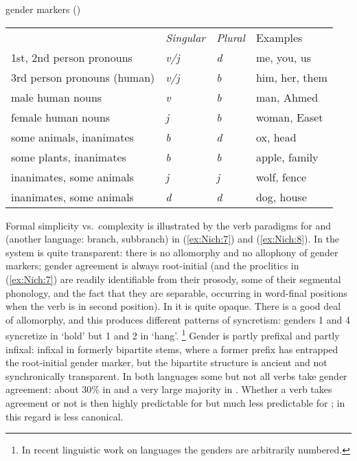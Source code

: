 \documentclass[output=collectionpaper]{langsci/langscibook}
\begin{document}
\ea
\label{ex:Nich:6}
 gender markers (\citealt[144]{Nichols2011})\\
\begin{tabular}{l>{\itshape}l>{\itshape}ll}
					 &	{\normalfont Singular} &	{\normalfont Plural} &	{\normalfont Examples} \\
1st, 2nd person pronouns & 			v/j	 &	d  &		me, you, us \\
3rd person pronouns (human) 	 &	v/j	 &	b 	 &	him, her, them \\
male human nouns 			 &	v 	 &	b 	 &	man, Ahmed \\
female human nouns			  &	j 	 &	b 	 &	woman, Easet \\
some animals, inanimates 		 &	b  &		d  &		ox, head \\
some plants, inanimates	 &		b 		 &b	 &	apple, family \\
inanimates, some animals  &			j 	 &	j  &		wolf, fence \\
inanimates, some animals  &			d 	 &	d  &		dog, house \\
\end{tabular}
\z

Formal simplicity vs.\ complexity is illustrated by the verb paradigms for  and  (another  language:  branch,  subbranch) in (\ref{ex:Nich:7}) and (\ref{ex:Nich:8}). In  the system is quite transparent: there is no allomorphy and no allophony of gender markers; gender agreement is always root-initial (and the proclitics in (\ref{ex:Nich:7}) are readily identifiable from their prosody, some of their segmental phonology, and the fact that they are separable, occurring in word-final positions when the verb is in second position). In  it is quite opaque. There is a good deal of allomorphy, and this produces different patterns of syncretism: genders 1 and 4 syncretize in `hold' but 1 and 2 in `hang'.%
\footnote{%
In recent linguistic work on  languages the genders are arbitrarily numbered.
} %
Gender is partly prefixal and partly infixal: infixal in formerly bipartite stems, where a former prefix has entrapped the root-initial gender marker, but the bipartite structure is ancient and not synchronically transparent. In both languages some but not all verbs take gender agreement: about 30\% in  and a very large majority in . Whether a verb takes agreement or not is then highly predictable for  but much less predictable for ; in this regard  is less canonical.
\end{document}
